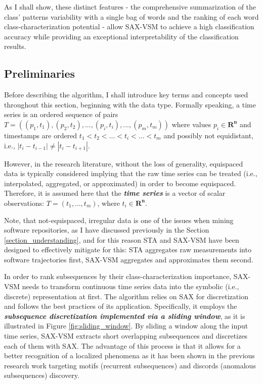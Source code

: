As I shall show, these distinct features - the comprehensive summarization of the class' patterns variability with a single bag 
of words and the ranking of each word class-characterization potential - allow SAX-VSM to achieve a high classification accuracy
while providing an exceptional interpretability of the classification results.

\subsection{Preliminaries}
Before describing the algorithm, I shall introduce key terms and concepts used throughout this section, beginning with the data type.
Formally speaking, a time series is an ordered sequence of pairs 
\mbox{$T=((p_{1},t_{1}),(p_{2},t_{2}),...,(p_{i},t_{i}),...,(p_{m},t_{m}))$}
where values $p_{i} \in \mathbf{R^{n}}$ and timestamps are ordered $t_{1} < t_{2} < ... < t_{i} <...<t_{m}$ 
and possibly not equidistant, i.e., $|t_{i}-t_{i-1}| \neq |t_{i}-t_{i+1}|$.

However, in the research literature, without the loss of generality, equispaced data is typically considered implying 
that the raw time series can be treated (i.e., interpolated, aggregated, or approximated) in order to become equispaced. 
Therefore, it is assumed here that the \textbf{\textit{time series}} is a vector of scalar observations: 
$T = ( t_{1},\dots,t_{m} )$, where $t_{i} \in \mathbf{R^{n}}$.

Note, that not-equispaced, irregular data is one of the issues when mining software repositories, as I have discussed previously in 
the Section \ref{section_understanding}, and for this reason STA and SAX-VSM have been designed to effectively mitigate for this: 
STA aggregates raw measurements into software trajectories first, SAX-VSM aggregates and approximates them second. 

In order to rank subsequences by their class-characterization importance, SAX-VSM needs to transform continuous time series data 
into the symbolic (i.e., discrete) representation at first. The algorithm relies on SAX \cite{citeulike:2821475} for discretization and follows 
the best practices of its application. Specifically, it employs the \textit{\textbf{subsequence discretization implemented via a sliding window}}, 
as it is illustrated in Figure \ref{fig:sliding_window}. By sliding a window along the input time series, SAX-VSM extracts short 
overlapping subsequences and discretizes each of them with SAX. The advantage of this process is that it allows for a better recognition of 
a localized phenomena as it has been shown in the previous research work targeting motifs (recurrent subsequences) \cite{citeulike:3977965} 
and discords (anomalous subsequences) \cite{citeulike:3175749} discovery. 

